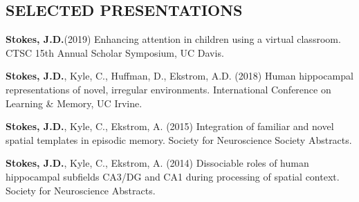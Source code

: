\documentclass[line,margin,10pt]{res}
\begin{document}
\begin{resume}
\section{SELECTED PRESENTATIONS} 
\textbf{Stokes, J.D.}(2019) Enhancing attention in children using a virtual classroom. CTSC 15th Annual Scholar Symposium, UC Davis.


\textbf{Stokes, J.D.}, Kyle, C., Huffman, D., Ekstrom, A.D. (2018) Human hippocampal representations of novel, irregular environments. International Conference on Learning \& Memory, UC Irvine.


%

\textbf{Stokes, J.D.}, Kyle, C., Ekstrom, A. (2015) Integration of familiar and novel spatial templates in episodic memory. Society for Neuroscience Society Abstracts.

%
%

\textbf{Stokes, J.D.}, Kyle, C., Ekstrom, A. (2014) Dissociable roles of human hippocampal subfields CA3/DG and CA1 during processing of spatial context. Society for Neuroscience Abstracts.


\end{resume}
\end{document}
